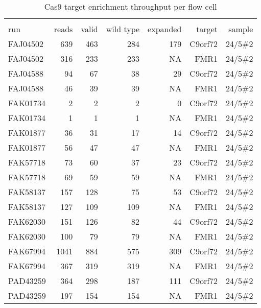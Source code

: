 \setlength\LTleft{0pt}
\setlength\LTright{0pt}
\begin{longtable}{lrrrrrr}
\caption[Cas9 target enrichment throughput per flow cell]{Cas9 target enrichment throughput per flow cell} \\
\label{tab:strique:Cas9} \\
run      & reads & valid & wild type & expanded & target  & sample  \\
\hline
FAJ04502 & 639   & 463   & 284       & 179      & C9orf72 & 24/5\#2 \\
FAJ04502 & 316   & 233   & 233       & NA       & FMR1    & 24/5\#2 \\
FAJ04588 & 94    & 67    & 38        & 29       & C9orf72 & 24/5\#2 \\
FAJ04588 & 46    & 39    & 39        & NA       & FMR1    & 24/5\#2 \\
FAK01734 & 2     & 2     & 2         & 0        & C9orf72 & 24/5\#2 \\
FAK01734 & 1     & 1     & 1         & NA       & FMR1    & 24/5\#2 \\
FAK01877 & 36    & 31    & 17        & 14       & C9orf72 & 24/5\#2 \\
FAK01877 & 56    & 47    & 47        & NA       & FMR1    & 24/5\#2 \\
FAK57718 & 73    & 60    & 37        & 23       & C9orf72 & 24/5\#2 \\
FAK57718 & 69    & 59    & 59        & NA       & FMR1    & 24/5\#2 \\
FAK58137 & 157   & 128   & 75        & 53       & C9orf72 & 24/5\#2 \\
FAK58137 & 127   & 109   & 109       & NA       & FMR1    & 24/5\#2 \\
FAK62030 & 151   & 126   & 82        & 44       & C9orf72 & 24/5\#2 \\
FAK62030 & 100   & 79    & 79        & NA       & FMR1    & 24/5\#2 \\
FAK67994 & 1041  & 884   & 575       & 309      & C9orf72 & 24/5\#2 \\
FAK67994 & 367   & 319   & 319       & NA       & FMR1    & 24/5\#2 \\
PAD43259 & 364   & 298   & 187       & 111      & C9orf72 & 24/5\#2 \\
PAD43259 & 197   & 154   & 154       & NA       & FMR1    & 24/5\#2
\end{longtable}


